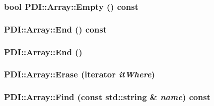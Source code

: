 \hypertarget{class_p_d_i_1_1_array_714f51d4a977b0c1d361c212cd1b2618}{
\subsubsection[{Empty}]{\setlength{\rightskip}{0pt plus 5cm}bool PDI::Array::Empty () const}}
\label{class_p_d_i_1_1_array_714f51d4a977b0c1d361c212cd1b2618}


\hypertarget{class_p_d_i_1_1_array_b7f91c93e42edd7d87407092f2b4e4e4}{
\subsubsection[{End}]{ PDI::Array::End () const}}
\label{class_p_d_i_1_1_array_b7f91c93e42edd7d87407092f2b4e4e4}


\hypertarget{class_p_d_i_1_1_array_a1300755f06a94db2df66b3fb45c93a4}{
\subsubsection[{End}]{ PDI::Array::End ()}}
\label{class_p_d_i_1_1_array_a1300755f06a94db2df66b3fb45c93a4}


\hypertarget{class_p_d_i_1_1_array_131c705ff2cf178d505e62c1f8801b67}{
\subsubsection[{Erase}]{ PDI::Array::Erase ({\bf iterator} {\em itWhere})}}
\label{class_p_d_i_1_1_array_131c705ff2cf178d505e62c1f8801b67}


\hypertarget{class_p_d_i_1_1_array_a21e99c0f49f2dc36b9d1fd42c31a87b}{
\subsubsection[{Find}]{ PDI::Array::Find (const std::string \& {\em name}) const}}
\label{class_p_d_i_1_1_array_a21e99c0f49f2dc36b9d1fd42c31a87b}


